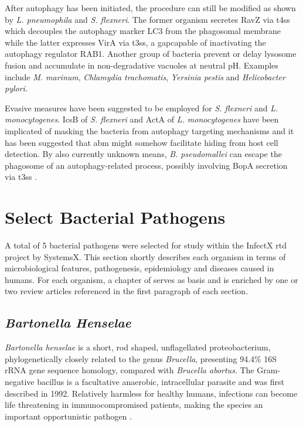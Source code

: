 After autophagy has been initiated, the procedure can still be modified as shown by \textit{L. pneumophila} and \textit{S. flexneri}. The former organism secretes RavZ via \gls{t4ss} which decouples the autophagy marker LC3 from the phagosomal membrane while the latter expresses VirA via \gls{t3ss}, a \gls{gap}capable of inactivating the autophagy regulator RAB1. Another group of bacteria prevent or delay lysosome fusion and accumulate in non-degradative vacuoles at neutral pH. Examples include \textit{M. marinum}, \textit{Chlamydia trachomatis}, \textit{Yersinia pestis} and \textit{Helicobacter pylori}.

Evasive measures have been suggested to be employed for \textit{S. flexneri} and \textit{L. monocytogenes}. IcsB of \textit{S. flexneri} and ActA of \textit{L. monocytogenes} have been implicated of masking the bacteria from autophagy targeting mechanisms and it has been suggested that \gls{abm} might somehow facilitate hiding from host cell detection. By also currently unknown means, \textit{B. pseudomallei} can escape the phagosome of an autophagy-related process, possibly involving BopA secretion via \gls{t3ss} \citep{Huang2014}.

\section{Select Bacterial Pathogens}

A total of 5 bacterial pathogens were selected for study within the InfectX \gls{rtd} project by SystemsX. This section shortly describes each organism in terms of microbiological features, pathogenesis, epidemiology and diseases caused in humans. For each organism, a chapter of \cite{Rolain2006} serves as basis and is enriched by one or two review articles referenced in the first paragraph of each section.

\subsection{\textit{Bartonella Henselae}}

\textit{Bartonella henselae} is a short, rod shaped, unflagellated proteobacterium, phylogenetically closely related to the genus \textit{Brucella}, presenting 94.4\% 16S rRNA gene sequence homology, compared with \textit{Brucella abortus}. The Gram-negative bacillus is a facultative anaerobic, intracellular parasite and was first described in 1992. Relatively harmless for healthy humans, infections can become life threatening in immunocompromised patients, making the species an important opportunistic pathogen \citep{Anderson1997,Harms2012}.

